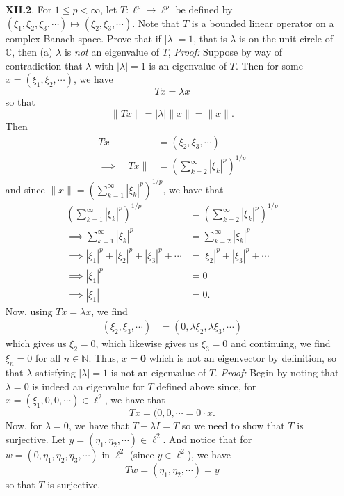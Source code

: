 \documentclass{article}
\begin{document}
\begin{itemize}
    \pagebreak
    \item[\textbf{XII.2}.] For $1 \leq p < \infty$, let $T: \ell^p \to \ell^p$ be defined by $(\xi_1, \xi_2, \xi_3, \cdots) \mapsto (\xi_2,\xi_3,\cdots)$. Note that $T$ is a bounded linear operator on a complex Banach space. Prove that if $|\lambda| = 1$, that is $\lambda$ is on the unit circle of $\mathbb{C}$, then
    \newline
    (a) $\lambda$ is \textit{not} an eigenvalue of $T$,
    \newline\newline
    \textit{Proof:} Suppose by way of contradiction that $\lambda$ with $|\lambda| = 1$ is an eigenvalue of $T$. Then for some $x = (\xi_1, \xi_2, \cdots)$, we have
    \[Tx = \lambda x\]
    so that
    \[\|Tx\| = |\lambda| \|x\| = \|x\|.\]
    Then
    \begin{align*}
        Tx &= (\xi_2, \xi_3, \cdots)\\
        \implies \|Tx\| &= \left(\sum_{k = 2}^{\infty} |\xi_k|^p\right)^{1/p}
    \end{align*}
    and since $\|x\| = \left(\sum_{k = 1}^{\infty}|\xi_k|^p\right)^{1/p}$, we have that 
    \begin{align*}
        \left(\sum_{k = 1}^{\infty}|\xi_k|^p\right)^{1/p} &= \left(\sum_{k = 2}^{\infty} |\xi_k|^p\right)^{1/p}\\
        \implies \sum_{k = 1}^{\infty} |\xi_k|^p &= \sum_{k = 2}^{\infty} |\xi_k|^p\\
        \implies |\xi_1|^p + |\xi_2|^p + |\xi_3|^p + \cdots &= |\xi_2|^p + |\xi_3|^p + \cdots\\
        \implies |\xi_1|^p &= 0\\
        \implies |\xi_1| &= 0.
    \end{align*}
    Now, using $Tx = \lambda x$, we find
    \begin{align*}
        (\xi_2, \xi_3,\cdots) &= (0, \lambda \xi_2, \lambda \xi_3, \cdots)
    \end{align*}
    which gives us $\xi_2 = 0$, which likewise gives us $\xi_3 = 0$ and continuing, we find $\xi_n = 0$ for all $n \in \mathbb{N}$. Thus, $x = \mathbf{0}$ which is not an eigenvector by definition, so that $\lambda$ satisfying $|\lambda| = 1$ is not an eigenvalue of $T$.
    \newline\newline
    \textit{Proof:} Begin by noting that $\lambda = 0$ is indeed an eigenvalue for $T$ defined above since, for $x = (\xi_1, 0, 0, \cdots) \in \ell^2$, we have that
    \[Tx = (0,0,\cdots = 0\cdot x.\]
    Now, for $\lambda = 0$, we have that $T - \lambda I = T$ so we need to show that $T$ is surjective. Let $y = (\eta_1, \eta_2, \cdots) \in \ell^2$. And notice that for $w = (0, \eta_1, \eta_2, \eta_3, \cdots)$ in $\ell^2$ (since $y \in \ell^2$), we have
    \[Tw = (\eta_1, \eta_2, \cdots) = y\]
    so that $T$ is surjective.



\end{itemize}
\end{document}
